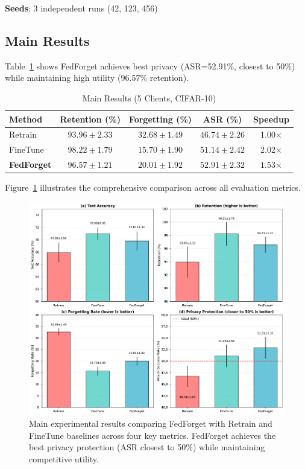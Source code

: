 \documentclass[10pt,twocolumn]{article}
\begin{document}
\textbf{Seeds}: 3 independent runs (42, 123, 456)

\subsection{Main Results}

Table~\ref{tab:main_results} shows FedForget achieves best privacy (ASR=52.91\%, closest to 50\%) while maintaining high utility (96.57\% retention).

\begin{table}[t]
\centering
\caption{Main Results (5 Clients, CIFAR-10)}
\label{tab:main_results}
\begin{tabular}{lcccc}
\toprule
Method & Retention (\%) & Forgetting (\%) & ASR (\%) & Speedup \\
\midrule
Retrain & $93.96 \pm 2.33$ & $\mathbf{32.68 \pm 1.49}$ & $46.74 \pm 2.26$ & 1.00× \\
FineTune & $\mathbf{98.22 \pm 1.79}$ & $15.70 \pm 1.90$ & $51.14 \pm 2.42$ & 2.02× \\
\textbf{FedForget} & $\mathbf{96.57 \pm 1.21}$ & $20.01 \pm 1.92$ & $\mathbf{52.91 \pm 2.32}$ & $\mathbf{1.53}$× \\
\bottomrule
\end{tabular}
\end{table}

Figure~\ref{fig:main_results} illustrates the comprehensive comparison across all evaluation metrics.

\begin{figure}[htbp]
\centering
\includegraphics[width=\columnwidth]{figures/figure1_main_results.pdf}
\caption{Main experimental results comparing FedForget with Retrain and FineTune baselines across four key metrics. FedForget achieves the best privacy protection (ASR closest to 50\%) while maintaining competitive utility.}
\label{fig:main_results}
\end{figure}
\end{document}
